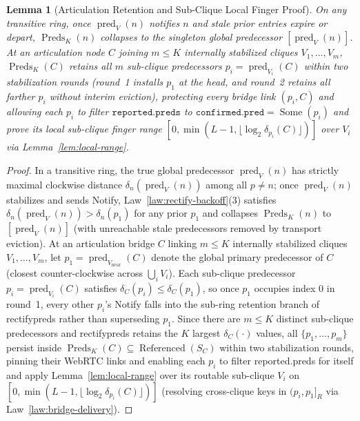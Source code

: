 \documentclass[journal]{IEEEtran}
\newtheorem{lemma}{Lemma}
\DeclareRobustCommand{\code}[1]{{\ttfamily\renewcommand{\_}{\textunderscore\allowbreak}#1}}
\begin{document}
\begin{lemma}[Articulation Retention and Sub-Clique Local Finger Proof]\label{lem:articulation}
On any transitive ring, once $\operatorname{pred}_V(n)$ notifies $n$ and stale prior entries expire or depart, $\operatorname{Preds}_K(n)$ collapses to the singleton
global predecessor $[\operatorname{pred}_V(n)]$.  At an articulation node $C$
joining $m\le K$ internally stabilized cliques $V_1,\dots,V_m$, $\operatorname{Preds}_K(C)$ retains
all $m$ sub-clique predecessors $p_i=\operatorname{pred}_{V_i}(C)$ within two
stabilization rounds (round~1 installs $p_1$ at the head, and round~2 retains all farther $p_i$ without interim eviction), protecting every bridge link $(p_i,C)$ and
allowing each $p_i$ to filter $\texttt{reported.preds}$ to
$\texttt{confirmed.pred}=\operatorname{Some}(p_i)$ and prove its local sub-clique finger
range $[0,\min(L-1,\lfloor\log_2\delta_{p_i}(C)\rfloor)]$ over $V_i$ via Lemma~\ref{lem:local-range}.
\end{lemma}
\begin{proof}
In a transitive ring, the true global predecessor $\operatorname{pred}_V(n)$ has strictly maximal clockwise distance $\delta_n(\operatorname{pred}_V(n))$ among all $p\neq n$; once $\operatorname{pred}_V(n)$ stabilizes and sends \code{Notify}, Law~\ref{law:rectify-backoff}(3) satisfies $\delta_n(\operatorname{pred}_V(n))>\delta_n(p_1)$ for any prior $p_1$ and collapses $\operatorname{Preds}_K(n)$ to $[\operatorname{pred}_V(n)]$ (with unreachable stale predecessors removed by transport eviction). At an articulation bridge $C$ linking $m\le K$ internally stabilized cliques $V_1,\dots,V_m$, let $p_1=\operatorname{pred}_{V_{\text{near}}}(C)$ denote the global primary predecessor of $C$ (closest counter-clockwise across $\bigcup_i V_i$). Each sub-clique predecessor $p_i=\operatorname{pred}_{V_i}(C)$ satisfies $\delta_C(p_i)\le\delta_C(p_1)$, so once $p_1$ occupies index $0$ in round~1, every other $p_i$'s \code{Notify} falls into the sub-ring retention branch of \code{rectify\_preds} rather than superseding $p_1$. Since there are $m\le K$ distinct sub-clique predecessors and \code{rectify\_preds} retains the $K$ largest $\delta_C(\cdot)$ values, all $\{p_1,\dots,p_m\}$ persist inside $\operatorname{Preds}_K(C)\subseteq\operatorname{Referenced}(S_C)$ within two stabilization rounds, pinning their WebRTC links and enabling each $p_i$ to filter \code{reported.preds} for itself and apply Lemma~\ref{lem:local-range} over its routable sub-clique $V_i$ on $[0,\min(L-1,\lfloor\log_2\delta_{p_i}(C)\rfloor)]$ (resolving cross-clique keys in $(p_i,p_1]_R$ via Law~\ref{law:bridge-delivery}).
\end{proof}
\end{document}
